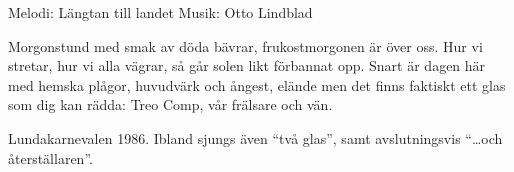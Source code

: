 \begin{song}

\begin{songmeta}
Melodi: Längtan till landet 
Musik: Otto Lindblad
\end{songmeta}

\begin{songtext}
Morgonstund med smak av döda bävrar,
frukostmorgonen är över oss.
Hur vi stretar, hur vi alla vägrar,
så går solen likt förbannat opp.
Snart är dagen här med hemska plågor,
huvudvärk och ångest, elände men
det finns faktiskt ett glas som dig kan rädda:
Treo Comp, vår frälsare och vän.
\end{songtext}

\begin{songnotes}
Lundakarnevalen 1986. 
Ibland sjungs även \textquotedblleft{}två glas\textquotedblright{}, samt avslutningsvis \textquotedblleft{}\ldots{}och
återställaren\textquotedblright{}.
\end{songnotes}

\end{song}
